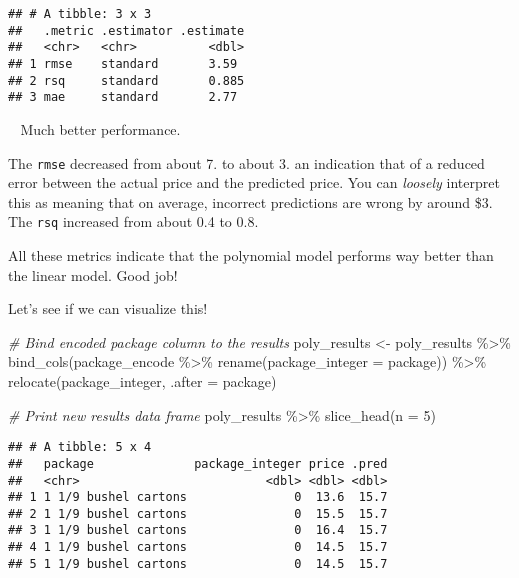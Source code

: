 \documentclass[
]{article}
\newenvironment{Shaded}{\begin{snugshade}}{\end{snugshade}}
\newcommand{\AttributeTok}[1]{\textcolor[rgb]{0.77,0.63,0.00}{#1}}
\newcommand{\CommentTok}[1]{\textcolor[rgb]{0.56,0.35,0.01}{\textit{#1}}}
\newcommand{\DecValTok}[1]{\textcolor[rgb]{0.00,0.00,0.81}{#1}}
\newcommand{\FunctionTok}[1]{\textcolor[rgb]{0.00,0.00,0.00}{#1}}
\newcommand{\NormalTok}[1]{#1}
\newcommand{\OtherTok}[1]{\textcolor[rgb]{0.56,0.35,0.01}{#1}}
\newcommand{\SpecialCharTok}[1]{\textcolor[rgb]{0.00,0.00,0.00}{#1}}
\begin{document}
\begin{verbatim}
## # A tibble: 3 x 3
##   .metric .estimator .estimate
##   <chr>   <chr>          <dbl>
## 1 rmse    standard       3.59 
## 2 rsq     standard       0.885
## 3 mae     standard       2.77
\end{verbatim}

🤩🤩 Much better performance.

The \texttt{rmse} decreased from about 7. to about 3. an indication that
of a reduced error between the actual price and the predicted price. You
can \emph{loosely} interpret this as meaning that on average, incorrect
predictions are wrong by around \$3. The \texttt{rsq} increased from
about 0.4 to 0.8.

All these metrics indicate that the polynomial model performs way better
than the linear model. Good job!

Let's see if we can visualize this!

\begin{Shaded}
\begin{Highlighting}[]
\CommentTok{\# Bind encoded package column to the results}
\NormalTok{poly\_results }\OtherTok{\textless{}{-}}\NormalTok{ poly\_results }\SpecialCharTok{\%\textgreater{}\%} 
  \FunctionTok{bind\_cols}\NormalTok{(package\_encode }\SpecialCharTok{\%\textgreater{}\%} 
              \FunctionTok{rename}\NormalTok{(}\AttributeTok{package\_integer =}\NormalTok{ package)) }\SpecialCharTok{\%\textgreater{}\%} 
  \FunctionTok{relocate}\NormalTok{(package\_integer, }\AttributeTok{.after =}\NormalTok{ package)}


\CommentTok{\# Print new results data frame}
\NormalTok{poly\_results }\SpecialCharTok{\%\textgreater{}\%} 
  \FunctionTok{slice\_head}\NormalTok{(}\AttributeTok{n =} \DecValTok{5}\NormalTok{)}
\end{Highlighting}
\end{Shaded}

\begin{verbatim}
## # A tibble: 5 x 4
##   package              package_integer price .pred
##   <chr>                          <dbl> <dbl> <dbl>
## 1 1 1/9 bushel cartons               0  13.6  15.7
## 2 1 1/9 bushel cartons               0  15.5  15.7
## 3 1 1/9 bushel cartons               0  16.4  15.7
## 4 1 1/9 bushel cartons               0  14.5  15.7
## 5 1 1/9 bushel cartons               0  14.5  15.7
\end{verbatim}
\end{document}
